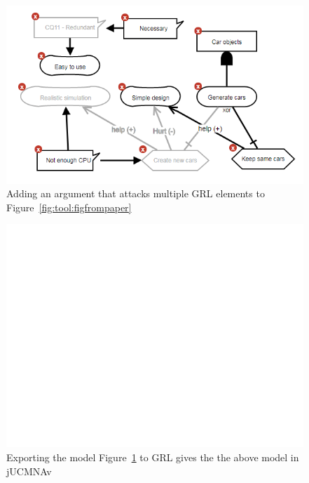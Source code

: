 \begin{figure}[ht]
\centering
\includegraphics[scale=0.8]{img/tool/model2}
\caption{Adding an argument that attacks multiple GRL elements to Figure~\ref{fig:tool:figfrompaper}}
\label{fig:tool:multipleattack}
\end{figure}

\begin{figure}[ht]
\centering
\includegraphics[scale=0.6]{img/tool/GRLmodel2}
\caption{Exporting the model Figure~\ref{fig:tool:multipleattack} to GRL gives the the above model in jUCMNAv}
\label{fig:tool:multipleattack1}
\end{figure}
